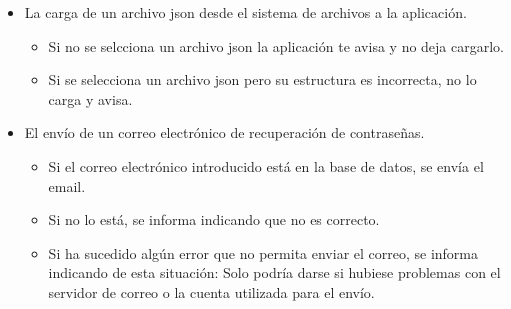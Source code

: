 \begin{itemize}
	\item La carga de un archivo json desde el sistema de archivos a la aplicación.
	\begin{itemize}
		\item Si no se selcciona un archivo json la aplicación te avisa y no deja cargarlo.
		\item Si se selecciona un archivo json pero su estructura es incorrecta, no lo carga y avisa.
	\end{itemize}
	\item El envío de un correo electrónico de recuperación de contraseñas.
	\begin{itemize}
		\item Si el correo electrónico introducido está en la base de datos, se envía el email.
		\item Si no lo está, se informa indicando que no es correcto.
		\item Si ha sucedido algún error que no permita enviar el correo, se informa indicando de esta situación: Solo podría darse si hubiese problemas con el servidor de correo o la cuenta utilizada para el envío.
	\end{itemize}
\end{itemize}
